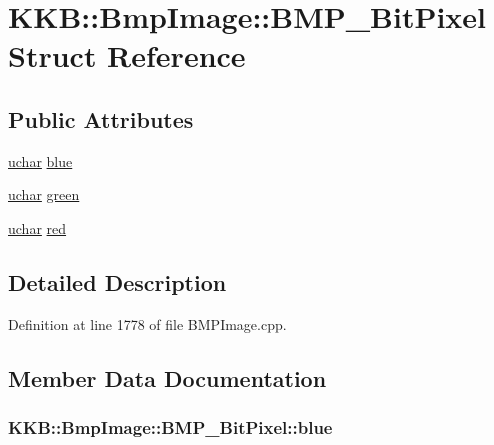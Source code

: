 \hypertarget{struct_bmp_image_1_1_b_m_p__24_bit_pixel}{}\section{K\+KB\+:\+:Bmp\+Image\+:\+:B\+M\+P\+\_\+Bit\+Pixel Struct Reference}
\label{struct_bmp_image_1_1_b_m_p__24_bit_pixel}
\subsection*{Public Attributes}
\begin{DoxyCompactItemize}
\item 
\hyperlink{namespace_k_k_b_ace9969169bf514f9ee6185186949cdf7}{uchar} \hyperlink{struct_bmp_image_1_1_b_m_p__24_bit_pixel_a8d2510000411ff7c9d4b8e9ee96c4aa9}{blue}
\item 
\hyperlink{namespace_k_k_b_ace9969169bf514f9ee6185186949cdf7}{uchar} \hyperlink{struct_bmp_image_1_1_b_m_p__24_bit_pixel_a481cbfde1fd52e11ebc0363ec953c314}{green}
\item 
\hyperlink{namespace_k_k_b_ace9969169bf514f9ee6185186949cdf7}{uchar} \hyperlink{struct_bmp_image_1_1_b_m_p__24_bit_pixel_ab084ef96b61054bc302d602aea18f643}{red}
\end{DoxyCompactItemize}


\subsection{Detailed Description}


Definition at line 1778 of file B\+M\+P\+Image.\+cpp.



\subsection{Member Data Documentation}
\subsubsection[{\texorpdfstring{blue}{blue}}]{ K\+K\+B\+::\+Bmp\+Image\+::\+B\+M\+P\+\_\+Bit\+Pixel\+::blue}\hypertarget{struct_bmp_image_1_1_b_m_p__24_bit_pixel_a8d2510000411ff7c9d4b8e9ee96c4aa9}{}\label{struct_bmp_image_1_1_b_m_p__24_bit_pixel_a8d2510000411ff7c9d4b8e9ee96c4aa9}


